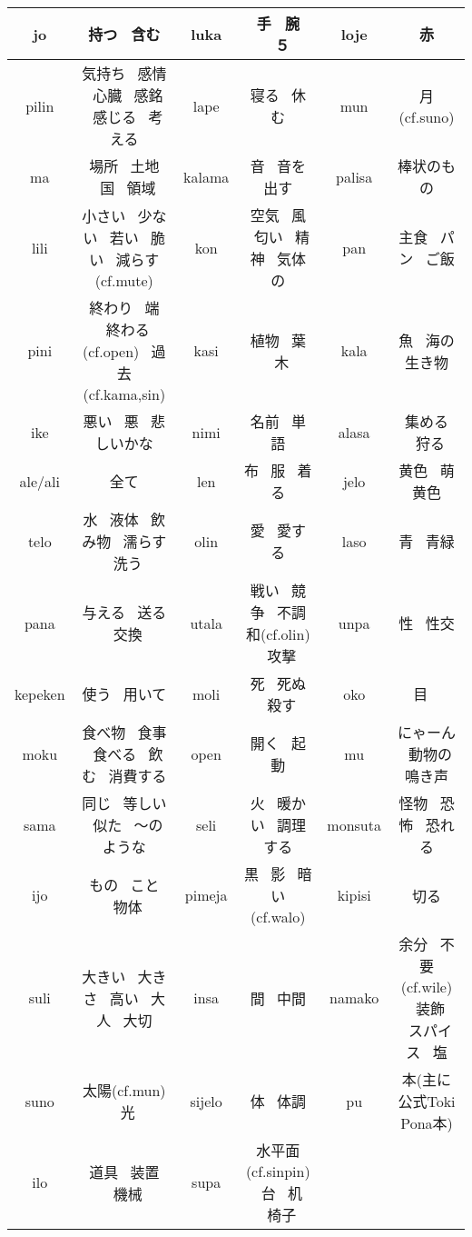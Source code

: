 \documentclass[a4paper,10pt]{article}
\begin{document}
\begin{landscape}
\begin{tabular}{|c|c||c|c||c|c|}
\hline jo & 持つ \ 含む & luka & 手 \ 腕 \ ５ & loje & 赤 \\
\hline pilin & 気持ち \ 感情 \ 心臓 \ 感銘 \ 感じる \ 考える & lape & 寝る \ 休む & mun & 月(cf.suno) \\
\hline ma & 場所 \ 土地 \ 国 \ 領域 & kalama & 音 \ 音を出す & palisa & 棒状のもの \\
\hline lili & 小さい \ 少ない \ 若い \ 脆い \ 減らす(cf.mute) & kon & 空気 \ 風 \ 匂い \ 精神 \ 気体の & pan & 主食 \ パン \ ご飯 \\
\hline pini & 終わり \ 端 \ 終わる(cf.open) \ 過去(cf.kama,sin) & kasi & 植物 \ 葉 \ 木 & kala & 魚 \ 海の生き物 \\
\hline ike & 悪い \ 悪 \ 悲しいかな & nimi & 名前 \ 単語 & alasa & 集める \ 狩る \\
\hline ale/ali & 全て & len & 布 \ 服 \ 着る & jelo & 黄色 \ 萌黄色 \\
\hline telo & 水 \ 液体 \ 飲み物 \ 濡らす \ 洗う & olin & 愛 \ 愛する & laso & 青 \ 青緑 \\
\hline pana & 与える \ 送る \ 交換 & utala & 戦い \ 競争 \ 不調和(cf.olin) \ 攻撃 & unpa & 性 \ 性交 \\
\hline kepeken & 使う \ 用いて & moli & 死 \ 死ぬ \ 殺す & oko & 目 \  \\
\hline moku & 食べ物 \ 食事 \ 食べる \ 飲む \ 消費する & open & 開く \ 起動 & mu & にゃーん \ 動物の鳴き声 \\
\hline sama & 同じ \ 等しい \ 似た \ 〜のような & seli & 火 \ 暖かい \ 調理する & monsuta & 怪物 \ 恐怖 \ 恐れる \\
\hline ijo & もの \ こと \ 物体 & pimeja & 黒 \ 影 \ 暗い(cf.walo) & kipisi & 切る \\
\hline suli & 大きい \ 大きさ \ 高い \ 大人 \ 大切 & insa & 間 \ 中間 & namako & 余分 \ 不要(cf.wile) \ 装飾 \ スパイス \ 塩 \\
\hline suno & 太陽(cf.mun) \ 光 & sijelo & 体 \ 体調 & pu & 本(主に公式Toki Pona本) \\
\hline ilo & 道具 \ 装置 \ 機械 & supa & 水平面(cf.sinpin) \ 台 \ 机 \ 椅子 &  &  \\
\hline
\end{tabular}

\end{landscape}
\end{document}

